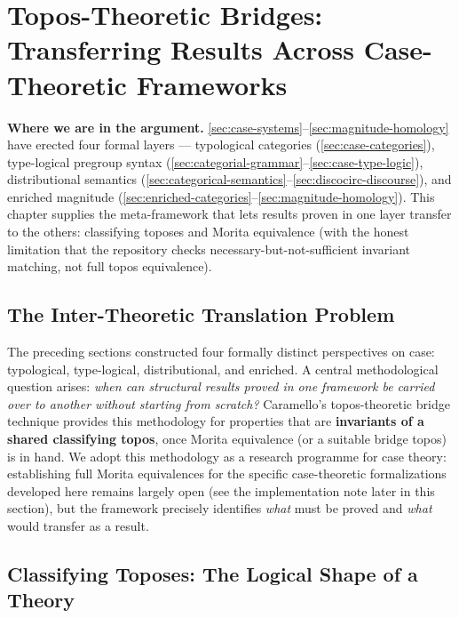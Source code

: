 \documentclass[
]{article}
\begin{document}
\newpage

\section{Topos-Theoretic Bridges: Transferring Results Across
Case-Theoretic Frameworks}\label{sec:topos-theory}

\textbf{Where we are in the argument.}
\autoref{sec:case-systems}--\autoref{sec:magnitude-homology} have
erected four formal layers --- typological categories
(\autoref{sec:case-categories}), type-logical pregroup syntax
(\autoref{sec:categorial-grammar}--\autoref{sec:case-type-logic}),
distributional semantics
(\autoref{sec:categorical-semantics}--\autoref{sec:discocirc-discourse}),
and enriched magnitude
(\autoref{sec:enriched-categories}--\autoref{sec:magnitude-homology}).
This chapter supplies the meta-framework that lets results proven in one
layer transfer to the others: classifying toposes and Morita equivalence
(with the honest limitation that the repository checks
necessary-but-not-sufficient invariant matching, not full topos
equivalence).

\subsection{The Inter-Theoretic Translation
Problem}\label{the-inter-theoretic-translation-problem}

The preceding sections constructed four formally distinct perspectives
on case: typological, type-logical, distributional, and enriched. A
central methodological question arises: \emph{when can structural
results proved in one framework be carried over to another without
starting from scratch?} Caramello's \citeyearpar{caramello2016bridges}
topos-theoretic bridge technique provides this methodology for
properties that are \textbf{invariants of a shared classifying topos},
once Morita equivalence (or a suitable bridge topos) is in hand. We
adopt this methodology as a research programme for case theory:
establishing full Morita equivalences for the specific case-theoretic
formalizations developed here remains largely open (see the
implementation note later in this section), but the framework precisely
identifies \emph{what} must be proved and \emph{what} would transfer as
a result.

\subsection{Classifying Toposes: The Logical Shape of a
Theory}\label{classifying-toposes-the-logical-shape-of-a-theory}
\end{document}
